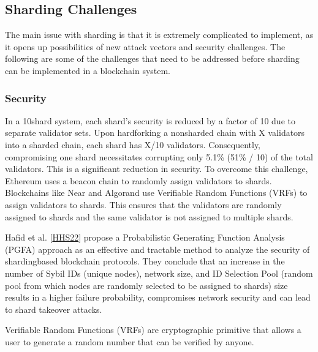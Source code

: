 \documentclass[letterpaper,10pt,english]{jupyterBook}
\begin{document}
\subsection{Sharding Challenges}
\label{\detokenize{SHARDING/sharding:sharding-challenges}}
\sphinxAtStartPar
The main issue with sharding is that it is extremely complicated to implement, as it opens up possibilities of new attack vectors and security challenges. The following are some of the challenges that need to be addressed before sharding can be implemented in a blockchain system.


\subsubsection{Security}
\label{\detokenize{SHARDING/sharding:security}}
\sphinxAtStartPar
In a 10\sphinxhyphen{}shard system, each shard’s security is reduced by a factor of 10 due to separate validator sets. Upon hard\sphinxhyphen{}forking a non\sphinxhyphen{}sharded chain with X validators into a sharded chain, each shard has X/10 validators. Consequently, compromising one shard necessitates corrupting only 5.1\% (51\% / 10) of the total validators. This is a significant reduction in security. To overcome this challenge, Ethereum uses a beacon chain to randomly assign validators to shards. Blockchains like Near and Algorand use Verifiable Random Functions (VRFs) to assign validators to shards. This ensures that the validators are randomly assigned to shards and the same validator is not assigned to multiple shards.

\sphinxAtStartPar
Hafid et al. {[}\hyperlink{cite.SHARDING/sharding:id70}{HHS22}{]} propose a Probabilistic Generating Function Analysis (PGFA) approach as an effective and tractable method to analyze the security of sharding\sphinxhyphen{}based blockchain protocols. They conclude that an increase in the number of Sybil IDs (unique nodes), network size, and ID Selection Pool (random pool from which nodes are randomly selected to be assigned to shards) size results in a higher failure probability, compromises network security and can lead to shard takeover attacks.

\begin{sphinxShadowBox}

\sphinxAtStartPar
Verifiable Random Functions (VRFs) are cryptographic primitive that allows a user to generate a random number that can be verified by anyone.
\end{sphinxShadowBox}
\end{document}
